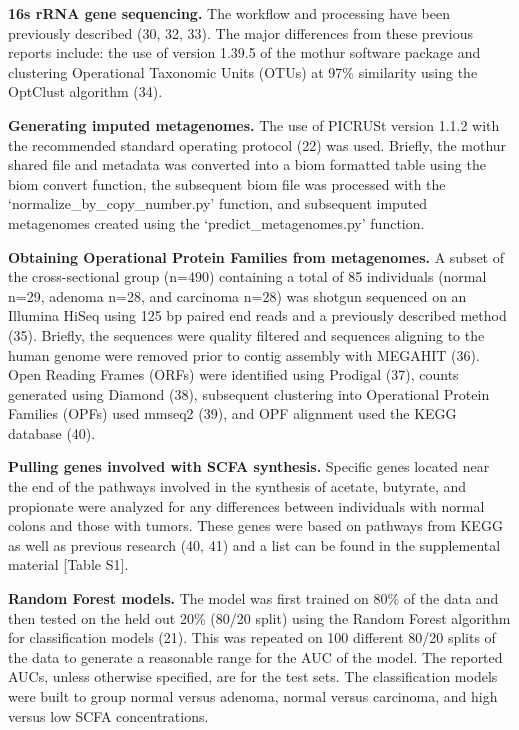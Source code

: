 \documentclass[11pt,]{article}
\begin{document}
\textbf{16s rRNA gene sequencing.} The workflow and processing have been
previously described (30, 32, 33). The major differences from these
previous reports include: the use of version 1.39.5 of the mothur
software package and clustering Operational Taxonomic Units (OTUs) at
97\% similarity using the OptClust algorithm (34).

\textbf{Generating imputed metagenomes.} The use of PICRUSt version
1.1.2 with the recommended standard operating protocol (22) was used.
Briefly, the mothur shared file and metadata was converted into a biom
formatted table using the biom convert function, the subsequent biom
file was processed with the `normalize\_by\_copy\_number.py' function,
and subsequent imputed metagenomes created using the
`predict\_metagenomes.py' function.

\textbf{Obtaining Operational Protein Families from metagenomes.} A
subset of the cross-sectional group (n=490) containing a total of 85
individuals (normal n=29, adenoma n=28, and carcinoma n=28) was shotgun
sequenced on an Illumina HiSeq using 125 bp paired end reads and a
previously described method (35). Briefly, the sequences were quality
filtered and sequences aligning to the human genome were removed prior
to contig assembly with MEGAHIT (36). Open Reading Frames (ORFs) were
identified using Prodigal (37), counts generated using Diamond (38),
subsequent clustering into Operational Protein Families (OPFs) used
mmseq2 (39), and OPF alignment used the KEGG database (40).

\textbf{Pulling genes involved with SCFA synthesis.} Specific genes
located near the end of the pathways involved in the synthesis of
acetate, butyrate, and propionate were analyzed for any differences
between individuals with normal colons and those with tumors. These
genes were based on pathways from KEGG as well as previous research (40,
41) and a list can be found in the supplemental material {[}Table S1{]}.

\textbf{Random Forest models.} The model was first trained on 80\% of
the data and then tested on the held out 20\% (80/20 split) using the
Random Forest algorithm for classification models (21). This was
repeated on 100 different 80/20 splits of the data to generate a
reasonable range for the AUC of the model. The reported AUCs, unless
otherwise specified, are for the test sets. The classification models
were built to group normal versus adenoma, normal versus carcinoma, and
high versus low SCFA concentrations.
\end{document}
